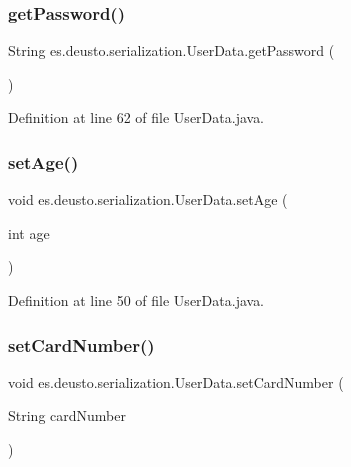 \subsubsection{\texorpdfstring{get\+Password()}{getPassword()}}
{\footnotesize\ttfamily String es.\+deusto.\+serialization.\+User\+Data.\+get\+Password (\begin{DoxyParamCaption}{ }\end{DoxyParamCaption})}



Definition at line 62 of file User\+Data.\+java.

\mbox{\label{classes_1_1deusto_1_1serialization_1_1_user_data_a0d79539941068f8b01614c15516e2207}} 
\subsubsection{\texorpdfstring{set\+Age()}{setAge()}}
{\footnotesize\ttfamily void es.\+deusto.\+serialization.\+User\+Data.\+set\+Age (\begin{DoxyParamCaption}\item[{int}]{age }\end{DoxyParamCaption})}



Definition at line 50 of file User\+Data.\+java.

\mbox{\label{classes_1_1deusto_1_1serialization_1_1_user_data_a20d9f43c3a0007407a02463743c65d87}} 
\subsubsection{\texorpdfstring{set\+Card\+Number()}{setCardNumber()}}
{\footnotesize\ttfamily void es.\+deusto.\+serialization.\+User\+Data.\+set\+Card\+Number (\begin{DoxyParamCaption}\item[{String}]{card\+Number }\end{DoxyParamCaption})}



